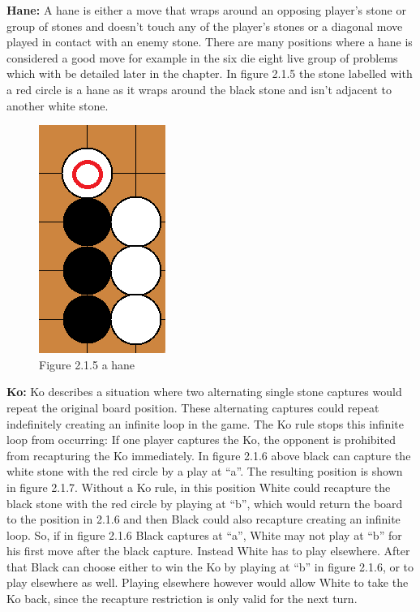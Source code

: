 \documentclass{l3proj}
\begin{document}
\textbf{Hane:} A hane is either a move that wraps around an opposing player's stone or group of stones and doesn’t touch any of the player’s stones or a diagonal move played in contact with an enemy stone. There are many positions where a hane is considered a good move for example in the six die eight live group of problems which with be detailed later in the chapter. In figure 2.1.5 the stone labelled with a red circle is a hane as it wraps around the black stone and isn’t adjacent to another white stone.

\begin{figure}[H]
\centering
\includegraphics[scale=0.5]{Images/ahane.png}
\caption{Figure 2.1.5 a hane}
\end{figure}

\textbf{Ko:} Ko describes a situation where two alternating single stone captures would repeat the original board position. These alternating captures could repeat indefinitely creating an infinite loop in the game. The Ko rule stops this infinite loop from occurring: If one player captures the Ko, the opponent is prohibited from recapturing the Ko immediately. In figure 2.1.6 above black can capture the white stone with the red circle by a play at “a”. The resulting position is shown in figure 2.1.7. Without a Ko rule, in this position White could recapture the black stone with the red circle by playing at “b”, which would return the board to the position in 2.1.6 and then Black could also recapture creating an infinite loop. So, if in figure 2.1.6 Black captures at “a”, White may not play at “b” for his first move after the black capture. Instead White has to play elsewhere. After that Black can choose either to win the Ko by playing at “b” in figure 2.1.6, or to play elsewhere as well. Playing elsewhere however would allow White to take the Ko back, since the recapture restriction is only valid for the next turn.
\end{document}
